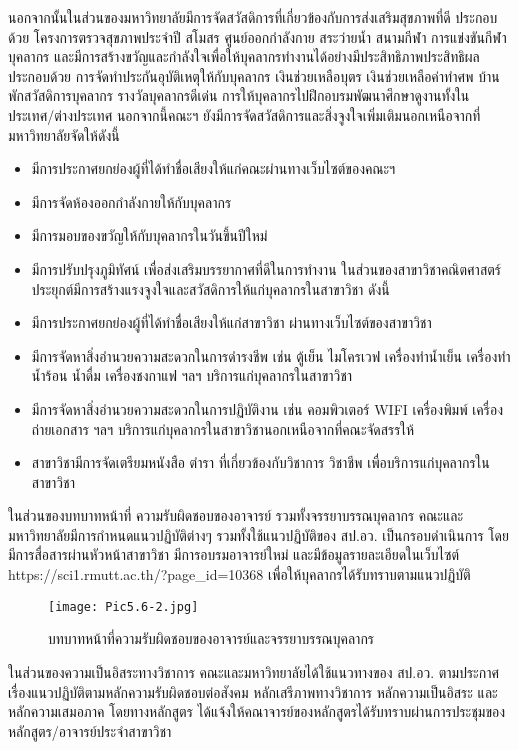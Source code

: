 \newpage
นอกจากนั้นในส่วนของมหาวิทยาลัยมีการจัดสวัสดิการที่เกี่ยวข้องกับการส่งเสริมสุขภาพที่ดี ประกอบด้วย
โครงการตรวจสุขภาพประจำปี สโมสร ศูนย์ออกกำลังกาย สระว่ายน้ำ สนามกีฬา การแข่งขันกีฬาบุคลากร และมีการสร้างขวัญและกำลังใจเพื่อให้บุคลากรทำงานได้อย่างมีประสิทธิภาพประสิทธิผล ประกอบด้วย การจัดทำประกันอุบัติเหตุให้กับบุคลากร เงินช่วยเหลือบุตร เงินช่วยเหลือค่าทำศพ บ้านพักสวัสดิการบุคลากร รางวัลบุคลากรดีเด่น การให้บุคลากรไปฝึกอบรมพัฒนาศึกษาดูงานทั้งในประเทศ/ต่างประเทศ นอกจากนี้คณะฯ ยังมีการจัดสวัสดิการและสิ่งจูงใจเพิ่มเติมนอกเหนือจากที่มหาวิทยาลัยจัดให้ดังนี้    
\begin{itemize}   
\item มีการประกาศยกย่องผู้ที่ได้ทำชื่อเสียงให้แก่คณะผ่านทางเว็บไซต์ของคณะฯ  
\item มีการจัดห้องออกกำลังกายให้กับบุคลากร 
\item มีการมอบของขวัญให้กับบุคลากรในวันขึ้นปีใหม่  
\item มีการปรับปรุงภูมิทัศน์ เพื่อส่งเสริมบรรยากาศที่ดีในการทำงาน
ในส่วนของสาขาวิชาคณิตศาสตร์ประยุกต์มีการสร้างแรงจูงใจและสวัสดิการให้แก่บุคลากรในสาขาวิชา ดังนี้
\item มีการประกาศยกย่องผู้ที่ได้ทำชื่อเสียงให้แก่สาขาวิชา ผ่านทางเว็บไซต์ของสาขาวิชา
\item มีการจัดหาสิ่งอำนวยความสะดวกในการดำรงชีพ เช่น ตู้เย็น ไมโครเวฟ เครื่องทำน้ำเย็น เครื่องทำ     น้ำร้อน น้ำดื่ม เครื่องชงกาแฟ ฯลฯ บริการแก่บุคลากรในสาขาวิชา
\item มีการจัดหาสิ่งอำนวยความสะดวกในการปฏิบัติงาน เช่น คอมพิวเตอร์ WIFI เครื่องพิมพ์ เครื่องถ่ายเอกสาร ฯลฯ บริการแก่บุคลากรในสาขาวิชานอกเหนือจากที่คณะจัดสรรให้
\item สาขาวิชามีการจัดเตรียมหนังสือ ตำรา ที่เกี่ยวข้องกับวิชาการ วิชาชีพ เพื่อบริการแก่บุคลากรในสาขาวิชา
\end{itemize}

ในส่วนของบทบาทหน้าที่ ความรับผิดชอบของอาจารย์ รวมทั้งจรรยาบรรณบุคลากร คณะและมหาวิทยาลัยมีการกำหนดแนวปฏิบัติต่างๆ รวมทั้งใช้แนวปฏิบัติของ สป.อว. เป็นกรอบดำเนินการ โดยมีการสื่อสารผ่านหัวหน้าสาขาวิชา มีการอบรมอาจารย์ใหม่ และมีข้อมูลรายละเอียดในเว็บไซต์ https://sci1.rmutt.ac.th/?page\_id=10368  เพื่อให้บุคลากรได้รับทราบตามแนวปฏิบัติ

\begin{figure}[h!]
	\texttt{[image: Pic5.6-2.jpg]}
	\caption{บทบาทหน้าที่ความรับผิดชอบของอาจารย์และจรรยาบรรณบุคลากร}
	\label{Pic5.6-2}
\end{figure}
ในส่วนของความเป็นอิสระทางวิชาการ คณะและมหาวิทยาลัยได้ใช้แนวทางของ สป.อว. ตามประกาศเรื่องแนวปฏิบัติตามหลักความรับผิดชอบต่อสังคม หลักเสรีภาพทางวิชาการ หลักความเป็นอิสระ และหลักความเสมอภาค โดยทางหลักสูตร ได้แจ้งให้คณาจารย์ของหลักสูตรได้รับทราบผ่านการประชุมของหลักสูตร/อาจารย์ประจำสาขาวิชา
\begin{doclist}
\end{doclist}

